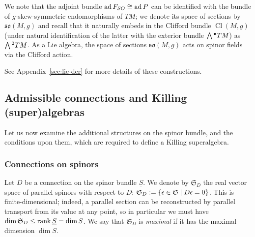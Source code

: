 \documentclass[11pt]{article}
\numberwithin{equation}{section}
\numberwithin{equation}{section}
\newcommand{\fso}{\mathfrak{so}}
\newcommand{\fS}{\mathfrak{S}}
\newcommand{\Sbundle}{\underline{S}}
\newcommand{\Wedge}{\mathchoice{{\textstyle\bigwedge}}{\bigwedge}{\bigwedge}{\bigwedge}}	%
\newcommand{\1}{\mathbbm{1}}
\DeclareMathOperator{\Cl}{Cl}
\DeclareMathOperator{\ad}{ad}
\begin{document}
We note that the adjoint bundle $\ad F_{\rm SO}\cong\ad P$ can be identified with the bundle of $g$-skew-symmetric endomorphisms of $TM$; we denote its space of sections by $\fso(M,g)$ and recall that it naturally embeds in the Clifford bundle $\Cl(M,g)$ (under natural identification of the latter with the exterior bundle $\Wedge^\bullet TM$) as $\Wedge^2 TM$. As a Lie algebra, the space of sections $\fso(M,g)$ acts on spinor fields via the Clifford action.

See Appendix~\ref{sec:lie-der} for more details of these constructions.

\subsection{Admissible connections and Killing (super)algebras}
\label{sec:admissible-ksa}

Let us now examine the additional structures on the spinor bundle, and the conditions upon them, which are required to define a Killing superalgebra.

\subsubsection{Connections on spinors}

Let $D$ be a connection on the spinor bundle $\Sbundle$. We denote by $\fS_D$ the real vector space of parallel spinors with respect to $D$:
$\fS_D := \qty{\epsilon\in\fS\mid D\epsilon = 0}$.
This is finite-dimensional; indeed, a parallel section can be reconstructed by parallel transport from its value at any point, so in particular we must have $\dim\fS_D\leq\rank\Sbundle=\dim S$. We say that $\fS_D$ is \emph{maximal} if it has the maximal dimension $\dim S$.
\end{document}

